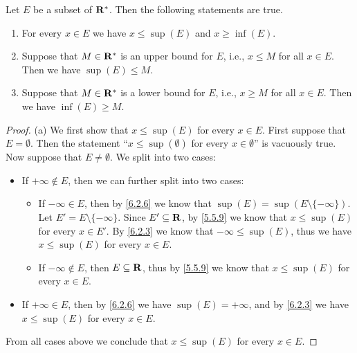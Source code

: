 \begin{theorem}\label{6.2.11}
  Let \(E\) be a subset of \(\mathbf{R}^*\).
  Then the following statements are true.
  \begin{enumerate}
    \item For every \(x \in E\) we have \(x \leq \sup(E)\) and \(x \geq \inf(E)\).
    \item Suppose that \(M \in \mathbf{R}^*\) is an upper bound for \(E\), i.e., \(x \leq M\) for all \(x \in E\).
          Then we have \(\sup(E) \leq M\).
    \item Suppose that \(M \in \mathbf{R}^*\) is a lower bound for \(E\), i.e., \(x \geq M\) for all \(x \in E\).
          Then we have \(\inf(E) \geq M\).
  \end{enumerate}
\end{theorem}

\begin{proof}{(a)}
  We first show that \(x \leq \sup(E)\) for every \(x \in E\).
  First suppose that \(E = \emptyset\).
  Then the statement ``\(x \leq \sup(\emptyset)\) for every \(x \in \emptyset\)'' is vacuously true.
  Now suppose that \(E \neq \emptyset\).
  We split into two cases:
  \begin{itemize}
    \item If \(+\infty \not\in E\), then we can further split into two cases:
          \begin{itemize}
            \item If \(-\infty \in E\), then by \cref{6.2.6} we know that \(\sup(E) = \sup(E \setminus \{-\infty\})\).
                  Let \(E' = E \setminus \{-\infty\}\).
                  Since \(E' \subseteq \mathbf{R}\), by \cref{5.5.9} we know that \(x \leq \sup(E)\) for every \(x \in E'\).
                  By \cref{6.2.3} we know that \(-\infty \leq \sup(E)\), thus we have \(x \leq \sup(E)\) for every \(x \in E\).
            \item If \(-\infty \notin E\), then \(E \subseteq \mathbf{R}\), thus by \cref{5.5.9} we know that \(x \leq \sup(E)\) for every \(x \in E\).
          \end{itemize}
    \item If \(+\infty \in E\), then by \cref{6.2.6} we have \(\sup(E) = +\infty\), and by \cref{6.2.3} we have \(x \leq \sup(E)\) for every \(x \in E\).
  \end{itemize}
  From all cases above we conclude that \(x \leq \sup(E)\) for every \(x \in E\).


\end{proof}
